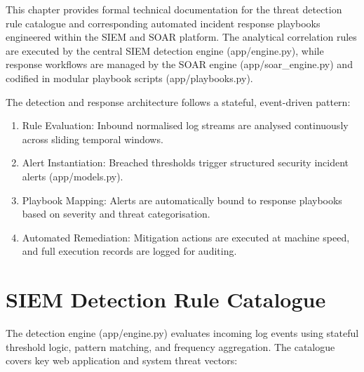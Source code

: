 This chapter provides formal technical documentation for the threat detection rule catalogue and corresponding automated incident response playbooks engineered within the SIEM and SOAR platform. The analytical correlation rules are executed by the central SIEM detection engine (app/engine.py), while response workflows are managed by the SOAR engine (app/soar\_engine.py) and codified in modular playbook scripts (app/playbooks.py).

The detection and response architecture follows a stateful, event-driven pattern:

\begin{enumerate}
  \item Rule Evaluation: Inbound normalised log streams are analysed continuously across sliding temporal windows.
  \item Alert Instantiation: Breached thresholds trigger structured security incident alerts (app/models.py).
  \item Playbook Mapping: Alerts are automatically bound to response playbooks based on severity and threat categorisation.
  \item Automated Remediation: Mitigation actions are executed at machine speed, and full execution records are logged for auditing.
\end{enumerate}

\section{SIEM Detection Rule Catalogue}

The detection engine (app/engine.py) evaluates incoming log events using stateful threshold logic, pattern matching, and frequency aggregation. The catalogue covers key web application and system threat vectors:

